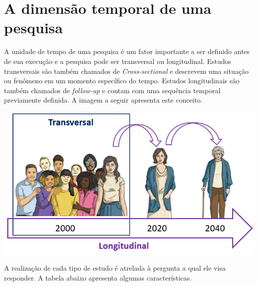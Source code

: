 \documentclass[
]{book}
\begin{document}
\hypertarget{a-dimensuxe3o-temporal-de-uma-pesquisa}{%
\section{A dimensão temporal de uma pesquisa}\label{a-dimensuxe3o-temporal-de-uma-pesquisa}}

A unidade de tempo de uma pesquisa é um fator importante a ser definido antes de sua execução e a pesquisa pode ser transversal ou longitudinal. Estudos transversais são também chamados de \emph{Cross-sectional} e descrevem uma situação ou fenômeno em um momento específico do tempo. Estudos longitudinais são também chamados de \emph{follow-up} e contam com uma sequência temporal previamente definida. A imagem a seguir apresenta este conceito.

\includegraphics{./img/cap_transversal_longitudinal.png}

A realização de cada tipo de estudo é atrelada à pergunta a qual ele visa responder. A tabela abaixo apresenta algumas características.
\end{document}
